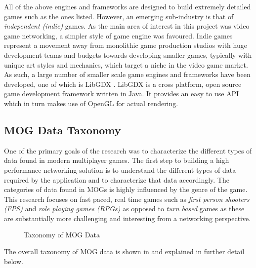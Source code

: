 All of the above engines and frameworks are designed to build extremely detailed games such as the ones listed. However, an emerging sub-industry is that of \textit{independent (indie)} games. As the main area of interest in this project was video game networking, a simpler style of game engine was favoured. Indie games represent a movement away from monolithic game production studios with huge development teams and budgets towards developing smaller games, typically with unique art styles and mechanics, which target a niche in the video game market. As such, a large number of smaller scale game engines and frameworks have been developed, one of which is LibGDX \cite{libgdx}. LibGDX is a cross platform, open source game development framework written in Java. It provides an easy to use API which in turn makes use of OpenGL for actual rendering. 

\subsection{MOG Data Taxonomy}\label{sec:taxonomy}
One of the primary goals of the research was to characterize the different types of data found in modern multiplayer games. The first step to building a high performance networking solution is to understand the different types of data required by the application and to characterize that data accordingly. The categories of data found in MOGs is highly influenced by the genre of the game. This research focuses on fast paced, real time games such as \textit{first person shooters (FPS)} and \textit{role playing games (RPGs)} as opposed to \textit{turn based} games as these are substantially more challenging and interesting from a networking perspective. 

\begin{figure}[H]
    \centering
    \caption{Taxonomy of MOG Data}
    \label{fig:taxonomy}
\end{figure}


The overall taxonomy of MOG data is shown in  and explained in further detail below.

